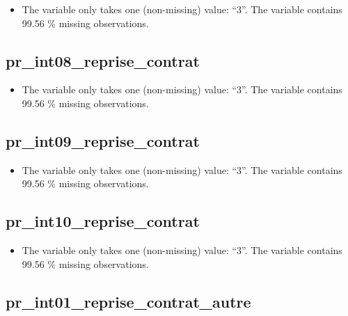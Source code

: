 \documentclass[
  letterpaper,
  DIV=11,
  numbers=noendperiod]{scrartcl}
\providecommand{\tightlist}{%
  \setlength{\itemsep}{0pt}\setlength{\parskip}{0pt}}
\begin{document}
\begin{itemize}
\tightlist
\item
  The variable only takes one (non-missing) value: ``3''. The variable
  contains 99.56 \% missing observations.
\end{itemize}

\fullline

\subsection{pr\_int08\_reprise\_contrat}\label{pr_int08_reprise_contrat}

\begin{itemize}
\tightlist
\item
  The variable only takes one (non-missing) value: ``3''. The variable
  contains 99.56 \% missing observations.
\end{itemize}

\fullline

\subsection{pr\_int09\_reprise\_contrat}\label{pr_int09_reprise_contrat}

\begin{itemize}
\tightlist
\item
  The variable only takes one (non-missing) value: ``3''. The variable
  contains 99.56 \% missing observations.
\end{itemize}

\fullline

\subsection{pr\_int10\_reprise\_contrat}\label{pr_int10_reprise_contrat}

\begin{itemize}
\tightlist
\item
  The variable only takes one (non-missing) value: ``3''. The variable
  contains 99.56 \% missing observations.
\end{itemize}

\fullline

\subsection{pr\_int01\_reprise\_contrat\_autre}\label{pr_int01_reprise_contrat_autre}

\bminione
\end{document}
